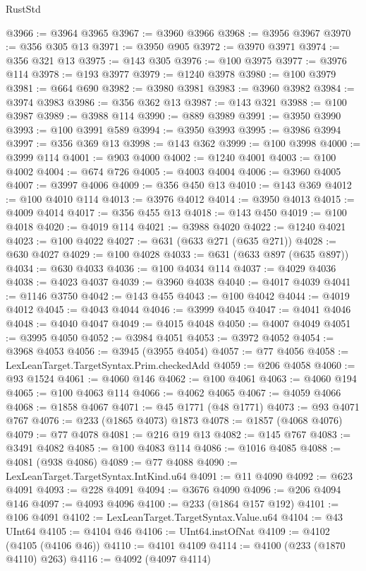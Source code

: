 \begin{lexlean}{RustStd}
\begin{coremodule}
@3966 := @3964 @3965
@3967 := @3960 @3966
@3968 := @3956 @3967
@3970 := @356 @305 @13
@3971 := @3950 @905
@3972 := @3970 @3971
@3974 := @356 @321 @13
@3975 := @143 @305
@3976 := @100 @3975
@3977 := @3976 @114
@3978 := @193 @3977
@3979 := @1240 @3978
@3980 := @100 @3979
@3981 := @664 @690
@3982 := @3980 @3981
@3983 := @3960 @3982
@3984 := @3974 @3983
@3986 := @356 @362 @13
@3987 := @143 @321
@3988 := @100 @3987
@3989 := @3988 @114
@3990 := @889 @3989
@3991 := @3950 @3990
@3993 := @100 @3991 @589
@3994 := @3950 @3993
@3995 := @3986 @3994
@3997 := @356 @369 @13
@3998 := @143 @362
@3999 := @100 @3998
@4000 := @3999 @114
@4001 := @903 @4000
@4002 := @1240 @4001
@4003 := @100 @4002
@4004 := @674 @726
@4005 := @4003 @4004
@4006 := @3960 @4005
@4007 := @3997 @4006
@4009 := @356 @450 @13
@4010 := @143 @369
@4012 := @100 @4010 @114
@4013 := @3976 @4012
@4014 := @3950 @4013
@4015 := @4009 @4014
@4017 := @356 @455 @13
@4018 := @143 @450
@4019 := @100 @4018
@4020 := @4019 @114
@4021 := @3988 @4020
@4022 := @1240 @4021
@4023 := @100 @4022
@4027 := @631 (@633 @271 (@635 @271))
@4028 := @630 @4027
@4029 := @100 @4028
@4033 := @631 (@633 @897 (@635 @897))
@4034 := @630 @4033
@4036 := @100 @4034 @114
@4037 := @4029 @4036
@4038 := @4023 @4037
@4039 := @3960 @4038
@4040 := @4017 @4039
@4041 := @1146 @3750
@4042 := @143 @455
@4043 := @100 @4042
@4044 := @4019 @4012
@4045 := @4043 @4044
@4046 := @3999 @4045
@4047 := @4041 @4046
@4048 := @4040 @4047
@4049 := @4015 @4048
@4050 := @4007 @4049
@4051 := @3995 @4050
@4052 := @3984 @4051
@4053 := @3972 @4052
@4054 := @3968 @4053
@4056 := @3945 (@3955 @4054)
@4057 := @77 @4056
@4058 := LexLeanTarget.TargetSyntax.Prim.checkedAdd
@4059 := @206 @4058
@4060 := @93 @1524
@4061 := @4060 @146
@4062 := @100 @4061
@4063 := @4060 @194
@4065 := @100 @4063 @114
@4066 := @4062 @4065
@4067 := @4059 @4066
@4068 := @1858 @4067
@4071 := @45 @1771 (@48 @1771)
@4073 := @93 @4071 @767
@4076 := @233 (@1865 @4073) @1873
@4078 := @1857 (@4068 @4076)
@4079 := @77 @4078
@4081 := @216 @19 @13
@4082 := @145 @767
@4083 := @3491 @4082
@4085 := @100 @4083 @114
@4086 := @1016 @4085
@4088 := @4081 (@938 @4086)
@4089 := @77 @4088
@4090 := LexLeanTarget.TargetSyntax.IntKind.u64
@4091 := @11 @4090
@4092 := @623 @4091
@4093 := @228 @4091
@4094 := @3676 @4090
@4096 := @206 @4094 @146
@4097 := @4093 @4096
@4100 := @233 (@1864 @157 @192)
@4101 := @106 @4091
@4102 := LexLeanTarget.TargetSyntax.Value.u64
@4104 := @43 UInt64
@4105 := @4104 @46
@4106 := UInt64.instOfNat
@4109 := @4102 (@4105 (@4106 @46))
@4110 := @4101 @4109
@4114 := @4100 (@233 (@1870 @4110) @263)
@4116 := @4092 (@4097 @4114)

\end{coremodule}
\end{lexlean}

